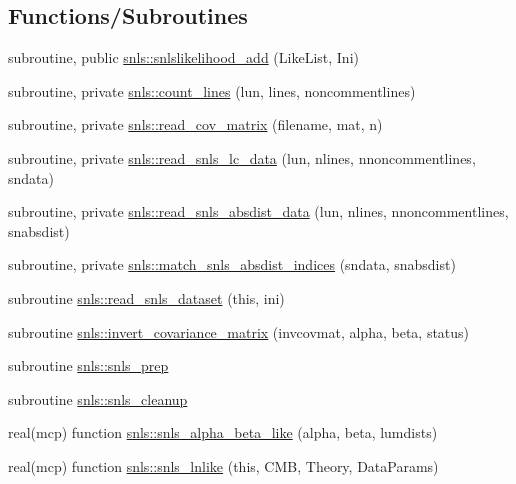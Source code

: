 \subsection*{Functions/\+Subroutines}
\begin{DoxyCompactItemize}
\item 
subroutine, public \mbox{\hyperlink{namespacesnls_a93456d40d3b103bc17faf5bafac66d76}{snls\+::snlslikelihood\+\_\+add}} (Like\+List, Ini)
\item 
subroutine, private \mbox{\hyperlink{namespacesnls_a956019aee61f8e8b602d1b4edb635909}{snls\+::count\+\_\+lines}} (lun, lines, noncommentlines)
\item 
subroutine, private \mbox{\hyperlink{namespacesnls_a7ebffb6abfd2942fbb0304d2ba6a234a}{snls\+::read\+\_\+cov\+\_\+matrix}} (filename, mat, n)
\item 
subroutine, private \mbox{\hyperlink{namespacesnls_a7f1db3cfd4fe644d65ae48d23062420a}{snls\+::read\+\_\+snls\+\_\+lc\+\_\+data}} (lun, nlines, nnoncommentlines, sndata)
\item 
subroutine, private \mbox{\hyperlink{namespacesnls_aac6e7755970b914ec53a7e7f2c6ad529}{snls\+::read\+\_\+snls\+\_\+absdist\+\_\+data}} (lun, nlines, nnoncommentlines, snabsdist)
\item 
subroutine, private \mbox{\hyperlink{namespacesnls_afabbfedccf34ae3b625359e7b29e67eb}{snls\+::match\+\_\+snls\+\_\+absdist\+\_\+indices}} (sndata, snabsdist)
\item 
subroutine \mbox{\hyperlink{namespacesnls_ae4b5fd7439c0c4620a5d9369c2782c9a}{snls\+::read\+\_\+snls\+\_\+dataset}} (this, ini)
\item 
subroutine \mbox{\hyperlink{namespacesnls_a46f1f0ddbecf69ac1dbfa16bfd6af020}{snls\+::invert\+\_\+covariance\+\_\+matrix}} (invcovmat, alpha, beta, status)
\item 
subroutine \mbox{\hyperlink{namespacesnls_aa7659f323fe80a70e09e7c1b3257cf5b}{snls\+::snls\+\_\+prep}}
\item 
subroutine \mbox{\hyperlink{namespacesnls_aceae969ecb486792f081d6533244fd09}{snls\+::snls\+\_\+cleanup}}
\item 
real(mcp) function \mbox{\hyperlink{namespacesnls_a31b64210643b2a6f625a1925f01c1194}{snls\+::snls\+\_\+alpha\+\_\+beta\+\_\+like}} (alpha, beta, lumdists)
\item 
real(mcp) function \mbox{\hyperlink{namespacesnls_a9983ad3e174e1ba1d0b862b463a8df40}{snls\+::snls\+\_\+lnlike}} (this, C\+MB, Theory, Data\+Params)
\end{DoxyCompactItemize}
